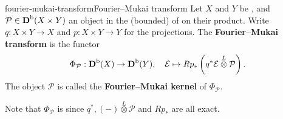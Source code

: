 \begin{topic}{fourier-mukai-transform}{Fourier--Mukai transform}
    Let $X$ and $Y$ be  , and $\mathcal{P} \in \textbf{D}^\textup{b}(X \times Y)$ an object in the (bounded)  of  on their product. Write $q : X \times Y \to X$ and $p : X \times Y \to Y$ for the projections. The \textbf{Fourier--Mukai transform} is the functor
    \[ \Phi_\mathcal{P} : \textbf{D}^\textup{b}(X) \to \textbf{D}^\textup{b}(Y), \quad \mathcal{E} \mapsto R p_* \left( q^* \mathcal{E} \overset{L}{\otimes} \mathcal{P} \right) . \]
    The object $\mathcal{P}$ is called the \textbf{Fourier--Mukai kernel} of $\Phi_\mathcal{P}$.
    
    Note that $\Phi_\mathcal{P}$ is  since $q^*, (-) \overset{L}{\otimes} \mathcal{P}$ and $R p_*$ are all exact.
\end{topic}

